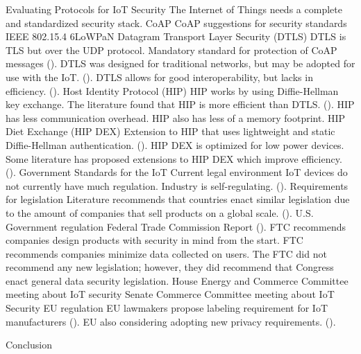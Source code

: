 \documentclass{article}
\begin{document}
\begin{outline}[enumerate]
\1 Evaluating Protocols for IoT Security
	\2 The Internet of Things needs a complete and standardized security stack. 
	\2 CoAP
		\3 CoAP suggestions for security standards
	\2 IEEE 802.15.4
	\2 6LoWPaN
	\2 Datagram Transport Layer Security (DTLS)
		\3 DTLS is TLS but over the UDP protocol.
		\3 Mandatory standard for protection of CoAP messages (\cite{Garcia-Morchon:2013:SII:2462096.2462117}).
		\3 DTLS was designed for traditional networks, but may be adopted for use with the IoT. (\cite{Keoh6817545}).
		\3 DTLS allows for good interoperability, but lacks in efficiency. (\cite{Garcia-Morchon:2013:SII:2462096.2462117}).
	\2 Host Identity Protocol (HIP)
		\3 HIP works by using Diffie-Hellman key exchange. 
		\3 The literature found that HIP is more efficient than DTLS. (\cite{Garcia-Morchon:2013:SII:2462096.2462117}).
			\4 HIP has less communication overhead.
			\4 HIP also has less of a memory footprint.
		\3 HIP Diet Exchange (HIP DEX)
			\4 Extension to HIP that uses lightweight and static Diffie-Hellman authentication. (\cite{Hummen}).
			\4 HIP DEX is optimized for low power devices. 
			\4 Some literature has proposed extensions to HIP DEX which improve efficiency. (\cite{Hummen}).
\1 Government Standards for the IoT  
	\2 Current legal environment
		\3 IoT devices do not currently have much regulation.
		\3 Industry is self-regulating. (\cite{Weber201023}). 
	\2 Requirements for legislation
		\3 Literature recommends that countries enact similar legislation due to the amount of companies that sell products on a 
			global scale. (\cite{Weber201023}). 
	\2 U.S. Government regulation
		\3 Federal Trade Commission Report (\cite{ftc}).
			\4 FTC recommends companies design products with security in mind from the start.
			\4 FTC recommends companies minimize data collected on users.
			\4 The FTC did not recommend any new legislation; however, they did recommend that Congress enact general data security legislation.
		\3 House Energy and Commerce Committee meeting about IoT security
		\3 Senate Commerce Committee meeting about IoT Security
	\2 EU regulation
		\3 EU lawmakers propose labeling requirement for IoT manufacturers (\cite{Stupp}).
		\3 EU also considering adopting new privacy requirements. (\cite{Kozlov}).

\1 Conclusion
\end{outline}
\end{document}
